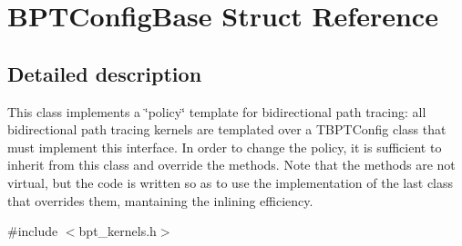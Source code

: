 \hypertarget{struct_b_p_t_config_base}{}\section{B\+P\+T\+Config\+Base Struct Reference}
\label{struct_b_p_t_config_base}


\subsection{Detailed description}
This class implements a \char`\"{}policy\char`\"{} template for bidirectional path tracing\+: all bidirectional path tracing kernels are templated over a T\+B\+P\+T\+Config class that must implement this interface. In order to change the policy, it is sufficient to inherit from this class and override the methods. Note that the methods are not virtual, but the code is written so as to use the implementation of the last class that overrides them, mantaining the inlining efficiency. 

{\ttfamily \#include $<$bpt\+\_\+kernels.\+h$>$}

